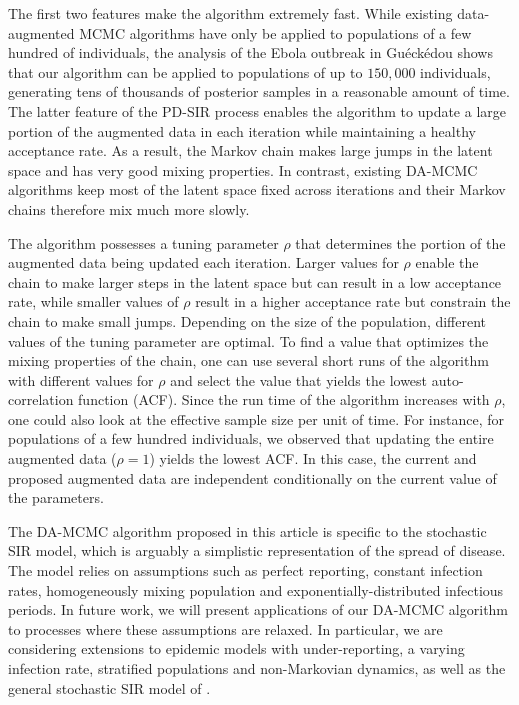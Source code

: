 \documentclass[11pt]{article}
\begin{document}
	The first two features make the algorithm extremely fast. While existing data-augmented MCMC algorithms have only be applied to populations of a few hundred of individuals, the analysis of the Ebola outbreak in Gu\'eck\'edou shows that our algorithm can be applied to populations of up to $150,000$ individuals, generating tens of thousands of posterior samples in a reasonable amount of time.	
	The latter feature of the PD-SIR process enables the algorithm to update a large portion of the augmented data in each iteration while maintaining a healthy acceptance rate. As a result, the Markov chain makes large jumps in the latent space and has very good mixing properties. In contrast, existing DA-MCMC algorithms keep most of the latent space fixed across iterations \cite{Gibson.1998, ONeill.1999, Fintzi.2017} and their Markov chains therefore mix much more slowly.
	
	The algorithm possesses a tuning parameter $\rho$ that determines the portion of the augmented data being updated each iteration. Larger values for $\rho$ enable the chain to make larger steps in the latent space but can result in a low acceptance rate, while smaller values of $\rho$ result in a higher acceptance rate but constrain the chain to make small jumps. Depending on the size of the population, different values of the tuning parameter are optimal. To find a value that optimizes the mixing properties of the chain, one can use several short runs of the algorithm with different values for $\rho$ and select the value that yields the lowest auto-correlation function (ACF). Since the run time of the algorithm increases with $\rho$, one could also look at the effective sample size per unit of time. For instance, for populations of a few hundred individuals, we observed that updating the entire augmented data ($\rho=1$) yields the lowest ACF. In this case, the current and proposed augmented data are independent conditionally on the current value of the parameters.
	
	The DA-MCMC algorithm proposed in this article is specific to the stochastic SIR model, which is arguably a simplistic representation of the spread of disease. The model relies on assumptions such as perfect reporting, constant infection rates, homogeneously mixing population and exponentially-distributed infectious periods. In future work, we will present applications of our DA-MCMC algorithm to processes where these assumptions are relaxed. In particular, we are considering extensions to epidemic models with under-reporting, a varying infection rate, stratified populations and non-Markovian dynamics, as well as the general stochastic SIR model of \cite{Severo.1969}.
	
\end{document}
